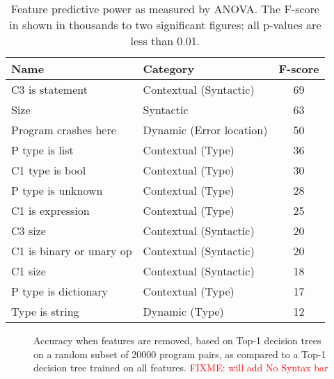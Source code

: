 \documentclass[conference]{IEEEtran}
\newcommand{\fixme}[1]{\textcolor{red}{FIXME: #1}}
\begin{document}
\begin{table}[]
\begin{center}
\begin{tabular}{llc}
Name                     & Category                & F-score \\ \bottomrule
C3 is statement          & Contextual (Syntactic)  & 69 \\
Size                     & Syntactic               & 63 \\
Program crashes here     & Dynamic (Error location)& 50 \\
P type is list           & Contextual (Type)       & 36 \\
C1 type is bool          & Contextual (Type)       & 30 \\
P type is unknown        & Contextual (Type)       & 28 \\
C1 is expression         & Contextual (Type)       & 25 \\
C3 size                  & Contextual (Syntactic)  & 20 \\
C1 is binary or unary op & Contextual (Syntactic)  & 20 \\
C1 size                  & Contextual (Syntactic)  & 18 \\
P type is dictionary     & Contextual (Type)       & 17 \\
Type is string           & Dynamic (Type)          & 12 \\
\toprule
\end{tabular}
\end{center}
\caption{Feature predictive power as measured by ANOVA.  The F-score in
shown in
thousands to two significant figures; all p-values are less than 0.01.}
\label{tab-anova}
\end{table}

\begin{figure}
\caption{Accuracy when features are removed, based on Top-1 decision trees on a
random subset of 20000 program pairs, as compared to a Top-1 decision tree trained
on all features.
\fixme{will add No Syntax bar}
}
\label{fig-removing-features}
\end{figure}
\end{document}
